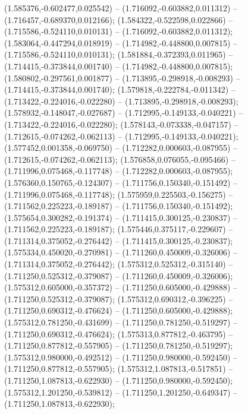  (1.585376,-0.602477,0.025542) -- (1.716092,-0.603882,0.011312) -- (1.716457,-0.689370,0.012166);
 (1.584322,-0.522598,0.022866) -- (1.715586,-0.524110,0.010131) -- (1.716092,-0.603882,0.011312);
 (1.583064,-0.447294,0.018919) -- (1.714982,-0.448800,0.007815) -- (1.715586,-0.524110,0.010131);
 (1.581884,-0.372393,0.011965) -- (1.714415,-0.373844,0.001740) -- (1.714982,-0.448800,0.007815);
 (1.580802,-0.297561,0.001877) -- (1.713895,-0.298918,-0.008293) -- (1.714415,-0.373844,0.001740);
 (1.579818,-0.222784,-0.011342) -- (1.713422,-0.224016,-0.022280) -- (1.713895,-0.298918,-0.008293);
 (1.578932,-0.148047,-0.027687) -- (1.712995,-0.149133,-0.040221) -- (1.713422,-0.224016,-0.022280);
 (1.578143,-0.073338,-0.047157) -- (1.712615,-0.074262,-0.062113) -- (1.712995,-0.149133,-0.040221);
 (1.577452,0.001358,-0.069750) -- (1.712282,0.000603,-0.087955) -- (1.712615,-0.074262,-0.062113);
 (1.576858,0.076055,-0.095466) -- (1.711996,0.075468,-0.117748) -- (1.712282,0.000603,-0.087955);
 (1.576360,0.150765,-0.124307) -- (1.711756,0.150340,-0.151492) -- (1.711996,0.075468,-0.117748);
 (1.575959,0.225503,-0.156275) -- (1.711562,0.225223,-0.189187) -- (1.711756,0.150340,-0.151492);
 (1.575654,0.300282,-0.191374) -- (1.711415,0.300125,-0.230837) -- (1.711562,0.225223,-0.189187);
 (1.575446,0.375117,-0.229607) -- (1.711314,0.375052,-0.276442) -- (1.711415,0.300125,-0.230837);
 (1.575334,0.450020,-0.270981) -- (1.711260,0.450009,-0.326006) -- (1.711314,0.375052,-0.276442);
 (1.575312,0.525312,-0.315140) -- (1.711250,0.525312,-0.379087) -- (1.711260,0.450009,-0.326006);
 (1.575312,0.605000,-0.357372) -- (1.711250,0.605000,-0.429888) -- (1.711250,0.525312,-0.379087);
 (1.575312,0.690312,-0.396225) -- (1.711250,0.690312,-0.476624) -- (1.711250,0.605000,-0.429888);
 (1.575312,0.781250,-0.431699) -- (1.711250,0.781250,-0.519297) -- (1.711250,0.690312,-0.476624);
 (1.575313,0.877812,-0.463795) -- (1.711250,0.877812,-0.557905) -- (1.711250,0.781250,-0.519297);
 (1.575312,0.980000,-0.492512) -- (1.711250,0.980000,-0.592450) -- (1.711250,0.877812,-0.557905);
 (1.575312,1.087813,-0.517851) -- (1.711250,1.087813,-0.622930) -- (1.711250,0.980000,-0.592450);
 (1.575312,1.201250,-0.539812) -- (1.711250,1.201250,-0.649347) -- (1.711250,1.087813,-0.622930);
